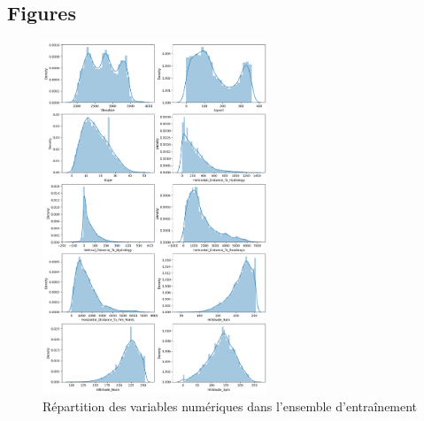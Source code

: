 \documentclass{article}
\begin{document}
\subsection{Figures}




\begin{figure}[h]
  \centering
  \includegraphics[width=0.6\textwidth]{all_distributions.png}
    \caption{Répartition des variables numériques dans l'ensemble d'entraînement}
  \label{fig:all_distributions}

  \end{figure}
\end{document}
